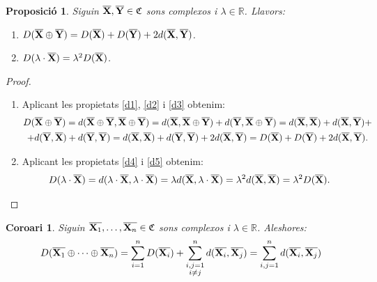 \documentclass{article}
\theoremstyle{math}
\newtheorem{prop}[definition]{Proposició}
\newtheorem{corollary}[definition]{Coro\lgem ari}
\newcommand{\0}{\ensuremath{\vb{0}}}
\newcommand{\X}{\ensuremath{\vb{X}}}
\newcommand{\Y}{\ensuremath{\vb{Y}}}
\newcommand{\RR}{\ensuremath{\mathbb{R}}} %
\begin{document}
\begin{prop}
    Siguin $\overline{\X},\overline{\Y}\in\mathfrak{C}$ sons complexos i $\lambda\in\RR$. Llavors:
    \begin{enumerate}[label=$D$\arabic*),ref=$D$\arabic*]
        \item\label{D1} $D(\overline{\X}\oplus\overline{\Y})=D(\overline{\X})+D(\overline{\Y})+2d(\overline{\X},\overline{\Y})$.
        \item\label{D2} $D(\lambda\cdot \overline{\X})=\lambda^2D(\overline{\X})$.
    \end{enumerate}
\end{prop}
\begin{proof}
    \hfill
    \begin{enumerate}[label=$D$\arabic*)]
        \item Aplicant les propietats \ref{d1}, \ref{d2} i \ref{d3} obtenim:
        \begin{multline*}
            D(\overline{\X}\oplus\overline{\Y})=d(\overline{\X}\oplus\overline{\Y},\overline{\X}\oplus\overline{\Y})=d(\overline{\X},\overline{\X}\oplus\overline{\Y})+d(\overline{\Y},\overline{\X}\oplus\overline{\Y})=d(\overline{\X},\overline{\X})+d(\overline{\X},\overline{\Y})+\\+d(\overline{\Y},\overline{\X})+d(\overline{\Y},\overline{\Y})=d(\overline{\X},\overline{\X})+d(\overline{\Y},\overline{\Y})+2d(\overline{\X},\overline{\Y})=D(\overline{\X})+D(\overline{\Y})+2d(\overline{\X},\overline{\Y}).
        \end{multline*}
        \item Aplicant les propietats \ref{d4} i \ref{d5} obtenim: $$D(\lambda\cdot\overline{\X})=d(\lambda\cdot\overline{\X},\lambda\cdot\overline{\X})=\lambda d(\overline{\X},\lambda\cdot\overline{\X})=\lambda^2d(\overline{\X},\overline{\X})=\lambda^2D(\overline{\X}).$$
    \end{enumerate}
\end{proof}
\begin{corollary}
    Siguin $\overline{\X_1},\ldots,\overline{\X_n}\in\mathfrak{C}$ sons complexos i $\lambda\in\RR$. Aleshores: $$D(\overline{\X_1}\oplus\cdots\oplus\overline{\X_n})=\sum_{i=1}^nD(\overline{\X_i})+\sum_{\substack{i,j=1\\i\ne j}}^nd(\overline{\X_i},\overline{\X_j})=\sum_{i,j=1}^nd(\overline{\X_i},\overline{\X_j})$$
\end{corollary}
\end{document}
